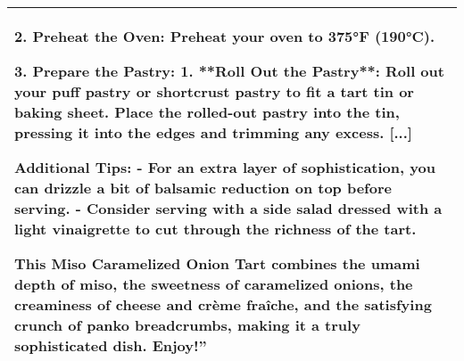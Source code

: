 \begin{table}[htbp]
{\begin{tabular}{|p{}|}
 2. Preheat the Oven:
Preheat your oven to 375°F (190°C).

 3. Prepare the Pastry:
1. **Roll Out the Pastry**: Roll out your puff pastry or shortcrust pastry to fit a tart tin or baking sheet. Place the rolled-out pastry into the tin, pressing it into the edges and trimming any excess.
[...]

 Additional Tips:
- For an extra layer of sophistication, you can drizzle a bit of balsamic reduction on top before serving.
- Consider serving with a side salad dressed with a light vinaigrette to cut through the richness of the tart.

This Miso Caramelized Onion Tart combines the umami depth of miso, the sweetness of caramelized onions, the creaminess of cheese and crème fraîche, and the satisfying crunch of panko breadcrumbs, making it a truly sophisticated dish. Enjoy!'' \\
    \hline
    \end{tabular}
}
\end{table}